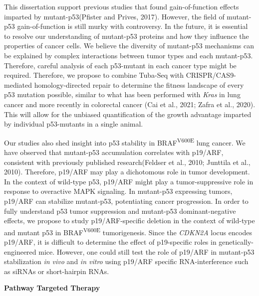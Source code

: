 This dissertation support previous studies that found gain-of-function effects imparted by mutant-p53(Pfister and Prives, 2017). However, the field of mutant-p53 gain-of-function is still murky with controversy. In the future, it is essential to resolve our understanding of mutant-p53 proteins and how they influence the properties of cancer cells. We believe the diversity of mutant-p53 mechanisms can be explained by complex interactions between tumor types and each mutant-p53. Therefore, careful analysis of each p53-mutant in each cancer type might be required. Therefore, we propose to combine Tuba-Seq with CRISPR/CAS9-mediated homology-directed repair to determine the fitness landscape of every p53 mutation possible, similar to what has been performed with \emph{Kras} in lung cancer and more recently in colorectal cancer (Cai et al., 2021; Zafra et al., 2020). This will allow for the unbiased quantification of the growth advantage imparted by individual p53-mutants in a single animal.

Our studies also shed insight into p53 stability in BRAF\textsuperscript{V600E} lung cancer. We have observed that mutant-p53 accumulation correlates with p19/ARF, consistent with previously published research(Feldser et al., 2010; Junttila et al., 2010). Therefore, p19/ARF may play a dichotomous role in tumor development. In the context of wild-type p53, p19/ARF might play a tumor-suppressive role in response to overactive MAPK signaling. In mutant-p53 expressing tumors, p19/ARF can stabilize mutant-p53, potentiating cancer progression. In order to fully understand p53 tumor suppression and mutant-p53 dominant-negative effects, we propose to study p19/ARF-specific deletion in the context of wild-type and mutant p53 in BRAF\textsuperscript{V600E} tumorigenesis. Since the \emph{CDKN2A} locus encodes p19/ARF, it is difficult to determine the effect of p19-specific roles in genetically-engineered mice. However, one could still test the role of p19/ARF in mutant-p53 stabilization \emph{in vivo} and \emph{in vitro} using p19/ARF specific RNA-interference such as siRNAs or short-hairpin RNAs.

\textbf{Pathway Targeted Therapy}

